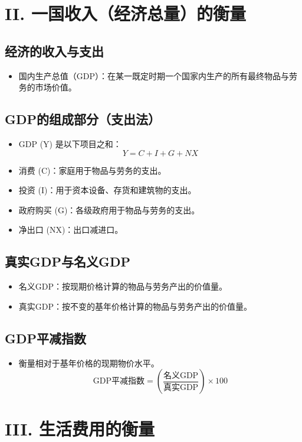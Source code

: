 \documentclass[12pt, a4paper]{article}
\begin{document}
\section*{II. 一国收入（经济总量）的衡量}
\subsection*{经济的收入与支出}
\begin{itemize}
    \item 国内生产总值（GDP）：在某一既定时期一个国家内生产的所有最终物品与劳务的市场价值。
\end{itemize}

\subsection*{GDP的组成部分（支出法）}
\begin{itemize}
    \item GDP (Y) 是以下项目之和：
    \[ Y = C + I + G + NX \]
    \item 消费 (C)：家庭用于物品与劳务的支出。
    \item 投资 (I)：用于资本设备、存货和建筑物的支出。
    \item 政府购买 (G)：各级政府用于物品与劳务的支出。
    \item 净出口 (NX)：出口减进口。
\end{itemize}

\subsection*{真实GDP与名义GDP}
\begin{itemize}
    \item 名义GDP：按现期价格计算的物品与劳务产出的价值量。
    \item 真实GDP：按不变的基年价格计算的物品与劳务产出的价值量。
\end{itemize}

\subsection*{GDP平减指数}
\begin{itemize}
    \item 衡量相对于基年价格的现期物价水平。
    \[ \text{GDP平减指数} = \left( \frac{\text{名义GDP}}{\text{真实GDP}} \right) \times 100 \]
\end{itemize}

\section*{III. 生活费用的衡量}
\end{document}
